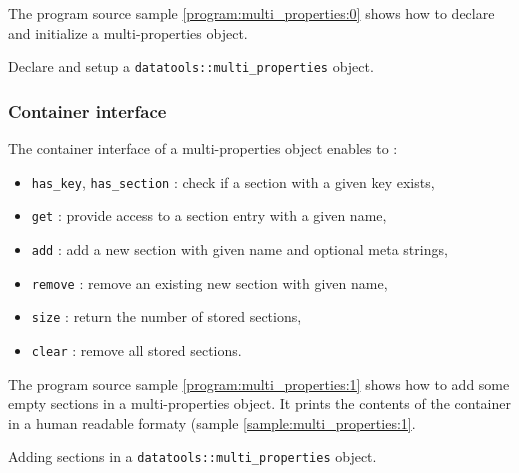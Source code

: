 \pn The program source sample \ref{program:multi_properties:0} shows how to
declare and initialize a multi-properties object.
\begin{program}[h]
\caption{Declare and setup a
  \texttt{datatools::multi\_properties}   object.
}
\label{program:multi_properties:0}
\end{program}

\subsubsection{Container interface}

\pn The container interface of a multi-properties object enables to :
\begin{itemize}

\item  \texttt{has\_key}, \texttt{has\_section} :  check if  a section
  with a given key exists,

\item \texttt{get}  : provide access to  a section entry  with a given
  name,

\item \texttt{add}  : add a new  section with given  name and optional
  meta strings,

\item  \texttt{remove} :  remove an  existing new  section  with given
  name,

\item \texttt{size} : return the number of stored sections,

\item \texttt{clear} : remove all stored sections.

\end{itemize}

\pn The  program source sample  \ref{program:multi_properties:1} shows
how to add some empty sections in a multi-properties object. It prints
the  contents of  the container  in a  human readable  formaty (sample
\ref{sample:multi_properties:1}.

\begin{program}[h]
\caption{Adding  sections  in a  \texttt{datatools::multi\_properties}
  object.  }
\label{program:multi_properties:1}
\end{program}


